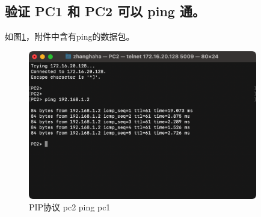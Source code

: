 \documentclass[a4paper,12pt]{report}
\begin{document}
\begin{spacing}{1.5}
\subsection{验证 PC1 和 PC2 可以 ping 通。}
如图\ref{25}，附件中含有ping的数据包。
\begin{figure}[htb!]
  \centering
\includegraphics[width=10cm]{figure/rip ping.png}
\caption{ PIP协议 pc2 ping pc1}
\label{25}
\end{figure}


\end{spacing}

\end{document}
